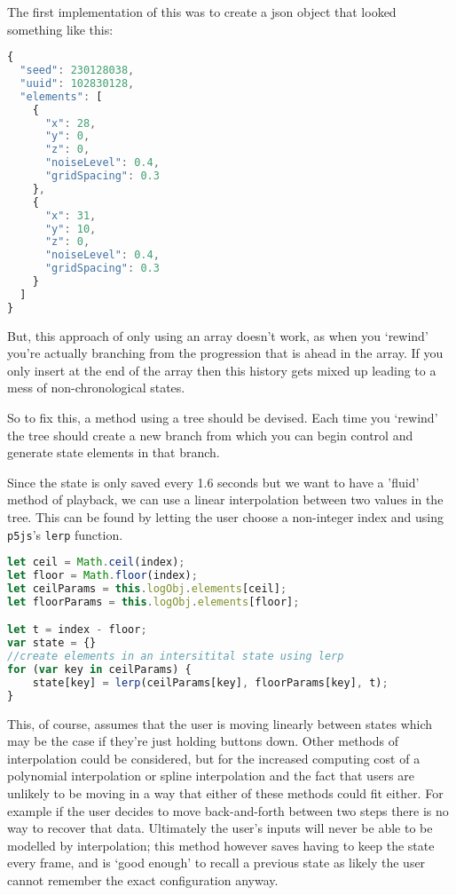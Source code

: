 The first implementation of this was to create a json object that looked
something like this:

\begin{lstlisting}[language=javascript]
{
  "seed": 230128038,
  "uuid": 102830128,
  "elements": [
    {
      "x": 28,
      "y": 0,
      "z": 0,
      "noiseLevel": 0.4,
      "gridSpacing": 0.3
    },
    {
      "x": 31,
      "y": 10,
      "z": 0,
      "noiseLevel": 0.4,
      "gridSpacing": 0.3
    }
  ]
}
\end{lstlisting}

But, this approach of only using an array doesn't work, as when you `rewind'
you're actually branching from the progression that is ahead in the array. If
you only insert at the end of the array then this history gets mixed up leading
to a mess of non-chronological states.

So to fix this, a method using a tree should be devised. Each time you `rewind'
the tree should create a new branch from which you can begin control and
generate state elements in that branch.


Since the state is only saved every 1.6 seconds but we want to have a 'fluid'
method of playback, we can use a linear interpolation between two values in the
tree. This can be found by letting the user choose a non-integer index and using
\verb|p5js|'s \verb|lerp| function.

\begin{lstlisting}[language=javascript]
let ceil = Math.ceil(index);
let floor = Math.floor(index);
let ceilParams = this.logObj.elements[ceil];
let floorParams = this.logObj.elements[floor];

let t = index - floor;
var state = {}
//create elements in an intersitital state using lerp
for (var key in ceilParams) {
    state[key] = lerp(ceilParams[key], floorParams[key], t);
}
\end{lstlisting}

This, of course, assumes that the user is moving linearly between states which
may be the case if they're just holding buttons down. Other methods of
interpolation could be considered, but for the increased computing cost of a
polynomial interpolation or spline interpolation and the fact that users are
unlikely to be moving in a way that either of these methods could fit either.
For example if the user decides to move back-and-forth between two steps there
is no way to recover that data. Ultimately the user's inputs will never be able
to be modelled by interpolation; this method however saves having to keep the
state every frame, and is `good enough' to recall a previous state as likely the
user cannot remember the exact configuration anyway.

